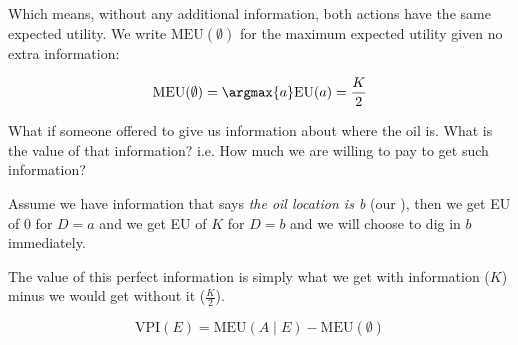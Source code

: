 {\begin{tcolorbox}[
    enhanced,
    attach boxed title to top left={xshift=5mm, yshift=-3mm, yshifttext=-1mm},
    colback=green!5!white,      
    colframe=green!40!black,    
    colbacktitle=red!80!black,  
    title=Answer,
    fonttitle=\bfseries,
    boxed title style={size=small, colframe=red!50!black}
]
Which means, without any additional information, both actions have the same expected utility. We write $\text{MEU}(\emptyset)$ for the maximum expected utility given no extra information:

\[
\text{MEU}(\emptyset) = \argmax{a} \text{EU}(a) = \frac{K}{2}
\]
\end{tcolorbox}
\begin{tcolorbox}[
    enhanced,
    attach boxed title to top left={xshift=5mm, yshift=-3mm, yshifttext=-1mm},
    colback=blue!5!white,
    colframe=blue!75!black,
    colbacktitle=red!80!black,
    title=Question,
    fonttitle=\bfseries,
    boxed title style={size=small, colframe=red!50!black} 
]
What if someone offered to give us information about where the oil is. What is the value of that information? i.e. How much we are willing to pay to get such information?
\end{tcolorbox}
Assume we have information that says \textit{the oil location is b} (our ), then we get EU of 0 for $D=a$ and we get EU of $K$ for $D=b$ and we will choose to dig in $b$ immediately.

The value of this perfect information is simply what we get with information ($K$) minus we would get without it ($\frac{K}{2}$).

\[
\text{VPI}(E) = \text{MEU}(A \mid E) - \text{MEU}(\emptyset)
\]
}{}
